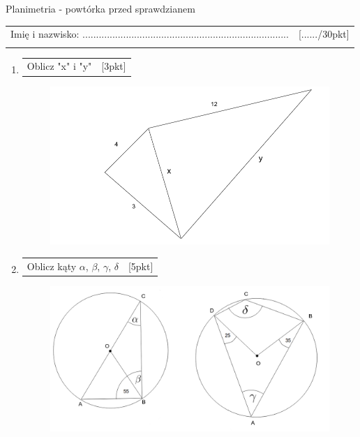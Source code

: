 \documentclass[12pt,a4paper]{article}
\begin{document}
			\begin{center}
		\LARGE Planimetria - powtórka przed sprawdzianem
	\end{center}
	\vspace{1.5cm}
	\begin{tabular}{p{13cm} r}
		Imię i nazwisko: ............................................................................
	 &[....../30pkt]\\ 
	 \vspace{0.5cm}
	\end{tabular}
	\begin{enumerate}[1.]
		\item  \begin{tabular}{p{13cm} r}
			Oblicz "x" i "y" &[3pkt]\\ 
		\end{tabular}
	\begin{figure}[h]
		\includegraphics[scale=0.4]{p1}
	\end{figure}
		\item  \begin{tabular}{p{13cm} r}
			Oblicz kąty $\alpha$, $\beta$, $\gamma$, $\delta$ &[5pkt]\\ 
		\end{tabular}
	\begin{figure}[h]
		\includegraphics[scale=0.4]{p2}

\end{figure}
\end{enumerate}
\end{document}
